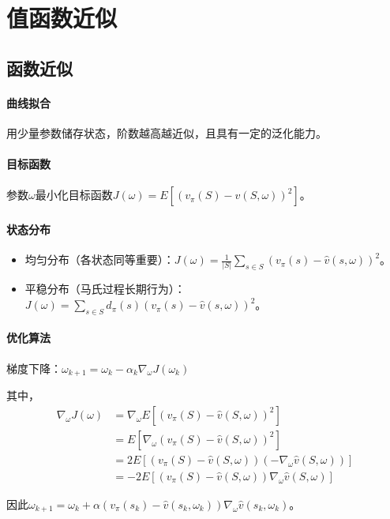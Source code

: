 \documentclass[
12pt, %
a4paper, 
oneside, %
headinclude,footinclude, %
]{scrartcl}
\begin{document}
\section{值函数近似}
\subsection{函数近似}
\paragraph{曲线拟合}
用少量参数储存状态，阶数越高越近似，且具有一定的泛化能力。
\paragraph{目标函数}
参数$ \omega $最小化目标函数$ J(\omega) = E[(v_{\pi}(S) - \hat{v}(S, \omega))^2] $。
\paragraph{状态分布}
\begin{itemize}
\item 均匀分布（各状态同等重要）：$ J(\omega) = \frac{1}{|S|}\sum_{s \in S}(v_{\pi}(s) - \hat{v}(s, \omega))^2 $。
\item 平稳分布（马氏过程长期行为）：$ J(\omega) = \sum_{s \in S}d_{\pi}(s)(v_{\pi}(s) - \hat{v}(s, \omega))^2 $。
\end{itemize}
\paragraph{优化算法}
梯度下降：$ \omega_{k + 1} = \omega_k - \alpha_k \nabla_\omega J(\omega_k) $

其中，
\begin{align*}
\nabla_\omega J(\omega)
&= \nabla_\omega E[(v_\pi(S) - \hat{v}(S, \omega))^2] \\
&= E[\nabla_\omega (v_\pi(S) - \hat{v}(S, \omega))^2] \\
&= 2E[(v_\pi(S) - \hat{v}(S, \omega))(-\nabla_\omega \hat{v}(S, \omega))] \\
&= -2E[(v_\pi(S) - \hat{v}(S, \omega)) \nabla_\omega \hat{v}(S, \omega)]
\end{align*}

因此$ \omega_{k + 1} = \omega_k + \alpha (v_\pi(s_k) - \hat{v}(s_k, \omega_k)) \nabla_\omega \hat{v}(s_k, \omega_k) $。
\end{document}
